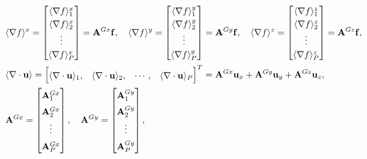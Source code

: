 \begin{align}\renewcommand{\arraystretch}{1.2}
&\langle \nabla f \rangle^x= \renewcommand{\arraystretch}{1.2}
\begin{bmatrix}
\langle \nabla f \rangle^x_1\\
\langle \nabla f \rangle^x_2\\
\vdots\\
\langle \nabla f \rangle^x_{\nParticles}
\end{bmatrix}=\mathbf{A}^{Gx}\mathbf{f},\quad
\langle \nabla f \rangle^y= \renewcommand{\arraystretch}{1.2}
\begin{bmatrix}
\langle \nabla f \rangle^y_1\\\langle \nabla f \rangle^y_2\\\vdots\\\langle \nabla f \rangle^y_{\nParticles}
\end{bmatrix}=\mathbf{A}^{Gy}\mathbf{f},\quad
\langle \nabla f \rangle^z= \renewcommand{\arraystretch}{1.2}
\begin{bmatrix}
\langle \nabla f \rangle^z_1\\\langle \nabla f \rangle^z_2\\\vdots\\\langle \nabla f \rangle^z_{\nParticles}
\end{bmatrix}=\mathbf{A}^{Gz}\mathbf{f},\label{eq:grad_op}\\
&\langle \nabla \cdot \mathbf{u} \rangle=  \begin{bmatrix}
\langle \nabla \cdot \mathbf{u}\rangle_1,&\langle \nabla \cdot \mathbf{u} \rangle_2,&\cdots,&\langle \nabla \cdot \mathbf{u} \rangle_{\nParticles}
\end{bmatrix}^T= 
\mathbf{A}^{Gx} \mathbf{u}_x+
\mathbf{A}^{Gy} \mathbf{u}_y+
\mathbf{A}^{Gz} \mathbf{u}_z, \label{eq:Divergence_discretized}\\
&\mathbf{A}^{Gx}= \renewcommand*{\arraystretch}{1.5}
\begin{bmatrix}\mathbf{A}^{Gx}_1\\\mathbf{A}^{Gx}_2\\\vdots\\\mathbf{A}^{Gx}_{\nParticles}
\end{bmatrix},\quad
\mathbf{A}^{Gy}= \begin{bmatrix}
\mathbf{A}^{Gy}_1\\\mathbf{A}^{Gy}_2\\\vdots\\\mathbf{A}^{Gy}_{\nParticles}
\end{bmatrix},\quad

\end{align}
